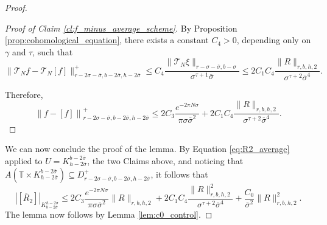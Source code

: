 \documentclass[10pt]{article}
\newcommand{\T}{\mathbb{T}}
\newcommand{\DomainP}[3]{D_{#1, #2, #3}^+}
\begin{document}
\begin{proof}
\begin{proof}[Proof of Claim \ref{cl:f_minus_average_scheme}]
By Proposition \ref{prop:cohomological_equation}, there exists a constant $C_4 > 0$, depending only on $\gamma$ and $\tau$, such that  
\[ \|\mathcal T_Nf - \mathcal T_N[f]\|_{r - 2\sigma - \overline\sigma, b- 2\overline\sigma, h - 2\overline\sigma}^+ \leq C_4\frac{\| \mathcal T_N\xi\|_{r - \sigma - \overline\sigma, b-\sigma}}{\sigma^{\tau + 1}\overline \sigma} \leq 2C_1C_4\frac{\| R \|_{r,b,h,2}}{\sigma^{\tau + 2} \overline \sigma^4}. \]

Therefore,
\[\left\|f - [f] \right\|_{r - 2\sigma - \overline\sigma, b- 2\overline\sigma, h - 2\overline\sigma}^+ \leq 2C_3\frac{e^{-2\pi N \sigma}}{\pi \sigma \overline \sigma^2} + 2C_1C_4\frac{\| R \|_{r,b,h,2}}{\sigma^{\tau + 2} \overline \sigma^4}. \]
\end{proof}

We can now conclude the proof of the lemma. By Equation \eqref{eq:R2_average} applied to $U = K^{b - 2\overline \sigma}_{h - 2\overline \sigma}$, the two Claims above, and noticing that $A(\T \times K^{b - 2\overline \sigma}_{h - 2\overline \sigma}) \subseteq \DomainP{r - 2\sigma - \overline\sigma}{b - 2\overline \sigma}{h - 2\overline \sigma}$, it follows that
\[ \left|\left[\overline{R}_2\right] \right|_{K_{b - 2\overline \sigma}^{h - 2\overline\sigma}} \leq 2C_3\frac{e^{-2\pi N \sigma}}{\pi \sigma \overline \sigma^2}\| R \|_{r,b,h,2} + 2C_1C_4\frac{\| R \|_{r,b,h,2}^2}{\sigma^{\tau + 2} \overline \sigma^4}  +   \frac{C_0}{\overline\sigma^2}\big\|R\big\|_{r, b, h,2}^2.\]
The lemma now follows by Lemma \ref{lem:c0_control}.
\end{proof}
\end{document}
